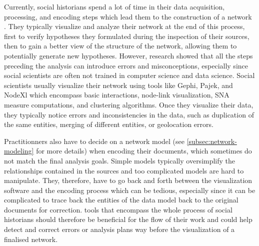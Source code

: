 Currently, social historians spend a lot of time in their data acquisition, processing, and encoding steps which lead them to the construction of a network \cite{dufournaudCommentRendreVisible2018, lemercierBackSourcesPracticing2021}.
They typically visualize and analyze their network at the end of this process, first to verify hypotheses they formulated during the inspection of their sources, then to gain a better view of the structure of the network, allowing them to potentially generate new hypotheses\cite{lemercier12FormalNetwork2015}.
However, research showed that all the steps preceding the analysis can introduce errors and misconceptions, especially since social scientists are often not trained in computer science and data science\cite{lemercierQuantitativeMethodsHumanities2019, alkadi2022}.
Social scientists usually visualize their network using \sna tools like Gephi, Pajek, and NodeXl which encompass basic interactions, node-link visualization, SNA measure computations, and clustering algorithms.
Once they visualize their data, they typically notice errors and inconsistencies in the data, such as duplication of the same entities, merging of different entities, or geolocation errors\cite{diesnerImpactEntityDisambiguation2015, alkadi2022}.

Practitionners also have to decide on a network model\cite{cristofoliAuxSourcesGrands2008} (see \autoref{subsec:network-modeling} for more details) when encoding their documents, which sometimes do not match the final analysis goals.
Simple models typically oversimplify the relationships contained in the sources\cite{lemercier12FormalNetwork2015} and too complicated models are hard to manipulate\cite{opitzInductionLargeScaleKnowledge2018}.
They, therefore, have to go back and forth between the visualization software and the encoding process which can be tedious, especially since it can be complicated to trace back the entities of the data model back to the original documents for correction.
\va tools that encompass the whole process of social historians should therefore be beneficial for the flow of their work and could help detect and correct errors or analysis plans way before the visualization of a finalised network.

